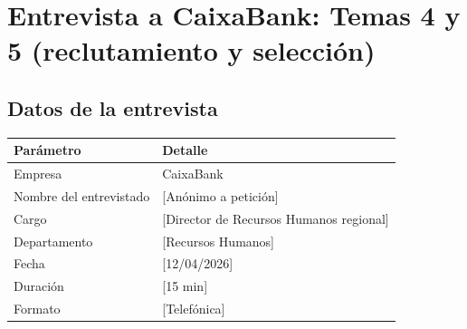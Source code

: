 %
%

\chapter{Entrevista a CaixaBank: Temas 4 y 5 (reclutamiento y selección)}

\section{Datos de la entrevista}

\begin{table}[H]
  \centering
  \begin{tabularx}{\textwidth}{lX}
    \toprule
    \textbf{Parámetro}       & \textbf{Detalle} \\
    \midrule
    Empresa                  & CaixaBank \\
    Nombre del entrevistado  & [Anónimo a petición] \\
    Cargo                    & [Director de Recursos Humanos regional] \\
    Departamento             & [Recursos Humanos] \\
    Fecha                    & [12/04/2026] \\
    Duración                 & [15 min] \\
    Formato                  & [Telefónica] \\
    \bottomrule
  \end{tabularx}
\end{table}

